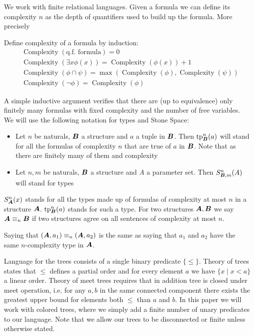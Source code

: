 \documentclass{amsart}
\DeclareMathOperator{\A}{\boldface A}
\DeclareMathOperator{\B}{\boldface B}
\DeclareMathOperator{\cx}{Complexity}
\begin{document}
We work with finite relational languages. Given a formula we can define its complexity $n$ as the depth of quantifiers used to build up the formula. More precisely
\begin{Definition}
Define complexity of a formula by induction:
\begin{align*}
	&\cx(\text{q.f. formula}) = 0 \\
	&\cx(\exists x \phi(x)) = \cx(\phi(x)) + 1 \\
	&\cx(\phi \cap \psi) = \max(\cx(\phi), \cx(\psi)) \\
	&\cx(\neg \phi) = \cx(\phi)
\end{align*}
\end{Definition}
A simple inductive argument verifies that there are (up to equivalence) only finitely many formulas with fixed complexity and the number of free variables. We will use the following notation for types and Stone Space:
\begin{Definition}
	\begin{itemize}
		\item Let $n$ be naturals, $\B$ a structure and $a$ a tuple in $\B$. Then $\tp^n_{\B}(a)$ will stand for all the formulas of complexity $n$ that are true of $a$ in $\B$. Note that as there are finitely many of them and complexity
		\item Let $n,m$ be naturals, $\B$ a structure and $A$ a parameter set. Then $S^n_{\B, m}(A)$ will stand for types
	\end{itemize}
\end{Definition}

$S^n_{\A}(x)$ stands for all the types made up of formulas of complexity at most $n$ in a structure $\A$. $\tp^n_{\B}(a)$ stands for such a type. For two structures $\A, \B$ we say $\A \equiv_n \B$ if two structures agree on all sentences of complexity at most $n$.

\begin{Note}
	Saying that $(\A, a_1) \equiv_n (\A, a_2)$ is the same as saying that $a_1$ and $a_2$ have the same $n$-complexity type in $\A$.
\end{Note}

Language for the trees consists of a single binary predicate $\{\leq\}$. Theory of trees states that $\leq$ defines a partial order and for every element $a$ we have $\{x \mid x < a\}$ a linear order. Theory of meet trees requires that in addition tree is closed under meet operation, i.e. for any $a, b$ in the same connected component there exists the greatest upper bound for elements both $\leq$ than $a$ and $b$. In this paper we will work with colored trees, where we simply add a finite number of unary predicates to our language. Note that we allow our trees to be disconnected or finite unless otherwise stated.
\end{document}
